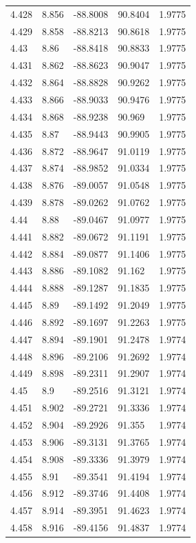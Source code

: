 \begin{tabular}{lllll}
4.428 & 8.856 & -88.8008 & 90.8404 & 1.9775 \\
4.429 & 8.858 & -88.8213 & 90.8618 & 1.9775 \\
4.43 & 8.86 & -88.8418 & 90.8833 & 1.9775 \\
4.431 & 8.862 & -88.8623 & 90.9047 & 1.9775 \\
4.432 & 8.864 & -88.8828 & 90.9262 & 1.9775 \\
4.433 & 8.866 & -88.9033 & 90.9476 & 1.9775 \\
4.434 & 8.868 & -88.9238 & 90.969 & 1.9775 \\
4.435 & 8.87 & -88.9443 & 90.9905 & 1.9775 \\
4.436 & 8.872 & -88.9647 & 91.0119 & 1.9775 \\
4.437 & 8.874 & -88.9852 & 91.0334 & 1.9775 \\
4.438 & 8.876 & -89.0057 & 91.0548 & 1.9775 \\
4.439 & 8.878 & -89.0262 & 91.0762 & 1.9775 \\
4.44 & 8.88 & -89.0467 & 91.0977 & 1.9775 \\
4.441 & 8.882 & -89.0672 & 91.1191 & 1.9775 \\
4.442 & 8.884 & -89.0877 & 91.1406 & 1.9775 \\
4.443 & 8.886 & -89.1082 & 91.162 & 1.9775 \\
4.444 & 8.888 & -89.1287 & 91.1835 & 1.9775 \\
4.445 & 8.89 & -89.1492 & 91.2049 & 1.9775 \\
4.446 & 8.892 & -89.1697 & 91.2263 & 1.9775 \\
4.447 & 8.894 & -89.1901 & 91.2478 & 1.9774 \\
4.448 & 8.896 & -89.2106 & 91.2692 & 1.9774 \\
4.449 & 8.898 & -89.2311 & 91.2907 & 1.9774 \\
4.45 & 8.9 & -89.2516 & 91.3121 & 1.9774 \\
4.451 & 8.902 & -89.2721 & 91.3336 & 1.9774 \\
4.452 & 8.904 & -89.2926 & 91.355 & 1.9774 \\
4.453 & 8.906 & -89.3131 & 91.3765 & 1.9774 \\
4.454 & 8.908 & -89.3336 & 91.3979 & 1.9774 \\
4.455 & 8.91 & -89.3541 & 91.4194 & 1.9774 \\
4.456 & 8.912 & -89.3746 & 91.4408 & 1.9774 \\
4.457 & 8.914 & -89.3951 & 91.4623 & 1.9774 \\
4.458 & 8.916 & -89.4156 & 91.4837 & 1.9774 \\

\end{tabular}
